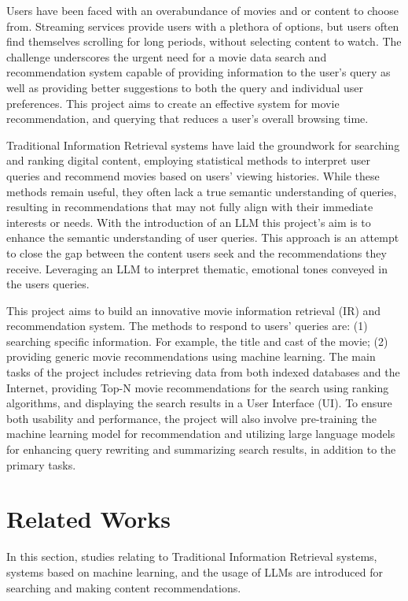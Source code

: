 \documentclass[journal]{IEEEtran}
\theoremstyle{mydefstyle}
\begin{document}
Users have been faced with an overabundance of movies and or content to choose from. Streaming services provide users with a plethora of options, but users often find themselves scrolling for long periods, without selecting content to watch. The challenge underscores the urgent need for a movie data search and recommendation system capable of providing information to the user’s query as well as providing better suggestions to both the query and individual user preferences. This project aims to create an effective system for movie recommendation, and querying that reduces a user's overall browsing time.

Traditional Information Retrieval systems have laid the groundwork for searching and ranking digital content, employing statistical methods to interpret user queries and recommend movies based on users' viewing histories. While these methods remain useful, they often lack a true semantic understanding of queries, resulting in recommendations that may not fully align with their immediate interests or needs. With the introduction of an LLM this project's aim is to enhance the semantic understanding of user queries. This approach is an attempt to close the gap between the content users seek and the recommendations they receive. Leveraging an LLM to interpret thematic, emotional tones conveyed in the users queries. 


This project aims to build an innovative movie information retrieval (IR) and recommendation system. The methods to respond to users’ queries are: (1) searching specific information. For example, the title and cast of the movie; (2) providing generic movie recommendations using machine learning. The main tasks of the project includes retrieving data from both indexed databases and the Internet, providing Top-N movie recommendations for the search using ranking algorithms, and displaying the search results in a User Interface (UI). To ensure both usability and performance, the project will also involve pre-training the machine learning model for recommendation and utilizing large language models for enhancing query rewriting and summarizing search results, in addition to the primary tasks. 

\section{Related Works}
In this section, studies relating to Traditional Information Retrieval systems, systems based on machine learning, and the usage of LLMs are introduced for searching and making content recommendations.
\end{document}
